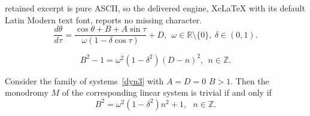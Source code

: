 \documentclass[10pt,a4paper]{amsart}
\begin{document}
retained excerpt is pure ASCII, so the delivered engine, XeLaTeX with its default Latin Modern text font, reports no missing character.
\begin{equation}\label{dyn3}
    \frac{d\theta}{d\tau}=\frac{\cos\theta+B+A\sin\tau}{\omega(1-\delta\cos\tau)}+D, \ \  \omega\in\mathbb R\setminus\{0\}, \ \delta\in(0,1).
\end{equation}

\begin{equation}B^2-1=\omega^2(1-\delta^2)(D-n)^2, \ \ n\in\mathbb{Z}.\label{montriv}\end{equation}

\begin{theorem} \label{growd3}
Consider the family of systems~\eqref{dyn3} with $A=D=0$ $B>1$. Then the monodromy $M$ of the corresponding linear system is trivial if and only if 
$$B^2=\omega^2(1-\delta^2)n^2+1, \ \ \ n\in\mathbb{Z}.$$
\end{theorem}
\end{document}
